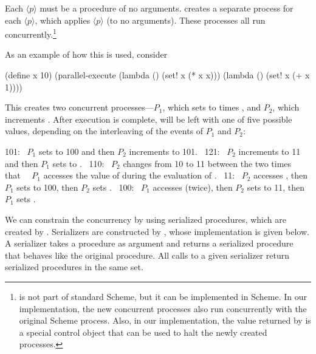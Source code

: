 \noindent
Each \( \langle p \rangle \) must be a procedure of no arguments.  
creates a separate process for each \( \langle p \rangle \), which applies \( \langle p \rangle \) (to no
arguments).  These processes all run
concurrently.\footnote{ is not part of standard Scheme,
but it can be implemented in  Scheme.  In our implementation, the
new concurrent processes also run concurrently with the original Scheme
process.  Also, in our implementation, the value returned by
 is a special control object that can be used to halt
the newly created processes.}

As an example of how this is used, consider

\begin{codeBlock}
(define x 10)
(parallel-execute
 (lambda () (set! x (* x x)))
 (lambda () (set! x (+ x 1))))
\end{codeBlock}

\noindent
This creates two concurrent processes---\( P_1 \), which sets  to
 times , and \( P_2 \), which increments .  After
execution is complete,  will be left with one of five possible values,
depending on the interleaving of the events of \( P_1 \) and \( P_2 \):

\begin{codeBlock}
101: ~\textrm{\( P_1 \) sets  to 100 and then \( P_2 \) increments  to 101.}~
121: ~\textrm{\( P_2 \) increments  to 11 and then \( P_1 \) sets  to  \code{*} .}~
110: ~\textrm{\( P_2 \) changes  from 10 to 11 between the two times that}~
     ~\textrm{\( P_1 \) accesses the value of  during the evaluation of .}~
 11: ~\textrm{\( P_2 \) accesses , then \( P_1 \) sets  to 100, then \( P_2 \) sets .}~
100: ~\textrm{\( P_1 \) accesses  (twice), then \( P_2 \) sets  to 11, then \( P_1 \) sets .}~
\end{codeBlock}

\noindent
We can constrain the concurrency by using serialized procedures, which are
created by . Serializers are constructed by
, whose implementation is given below.  A serializer
takes a procedure as argument and returns a serialized procedure that behaves
like the original procedure.  All calls to a given serializer return serialized
procedures in the same set.


